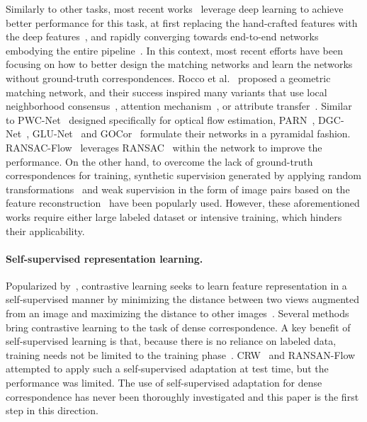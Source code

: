 \documentclass[10pt,twocolumn,letterpaper]{article}
\begin{document}
Similarly to other tasks, most recent works~\cite{kim2019semantic,teed2020raft,wiles2020d2d,jabri2020space,rocco2020efficient,li2020correspondence,li2020dual} leverage deep learning to achieve better performance for this task, at first replacing the hand-crafted features with the deep features~\cite{choy2016universal,kim2017fcss}, and rapidly converging towards end-to-end networks embodying the entire pipeline~\cite{rocco2018neighbourhood,kim2019semantic,li2020correspondence}. 
In this context, most recent efforts have been focusing on how to better design the matching networks and learn the networks without ground-truth correspondences. 
Rocco et al.~\cite{rocco2017convolutional,rocco2018end} proposed a geometric matching network, and their success inspired many variants that use local neighborhood consensus~\cite{rocco2018neighbourhood,li2020correspondence}, attention mechanism~\cite{huang2019dynamic}, or attribute transfer~\cite{kim2019semantic}. 
Similar to PWC-Net~\cite{sun2018pwc} designed specifically for optical flow estimation, PARN~\cite{jeon2018parn}, DGC-Net~\cite{melekhov2019dgc}, GLU-Net~\cite{truong2020glu} and GOCor~\cite{truong2020gocor} formulate their networks in a pyramidal fashion. RANSAC-Flow~\cite{shen2020ransac} leverages RANSAC~\cite{fischler1981random} within the network to improve the performance. On the other hand, to overcome the lack of ground-truth correspondences for training, synthetic supervision generated by applying random transformations~\cite{rocco2017convolutional,truong2020glu,min2020learning,truong2020gocor} and weak supervision in the form of image pairs based on the feature reconstruction~\cite{jeon2018parn,rocco2018end,kim2019semantic} have been popularly used. However, these aforementioned works require either large labeled dataset or intensive training, which hinders their applicability. 
\vspace{-10pt}

\paragraph{Self-supervised representation learning.}
Popularized by~\cite{chen2020simple,he2020momentum,chen2020improved,grill2020bootstrap}, contrastive learning seeks to learn feature representation in a self-supervised manner by minimizing the distance between two views augmented from an image and maximizing the distance to other images~\cite{hadsell2006dimensionality,dai2017contrastive,gupta2020contrastive}. Several methods~\cite{schmidt2016self,choy2016universal,kim2017dctm,kim2017fcss,wang2020dense,pinheiro2020unsupervised} bring contrastive learning to the task of dense correspondence. A key benefit of self-supervised learning is that, because there is no reliance on labeled data, training needs not be limited to the training phase~\cite{detone2016deep,oord2018representation,shocher2018zero,jabri2020space,lai2020mast,shen2020ransac}. CRW~\cite{jabri2020space} and RANSAN-Flow~\cite{shen2020ransac} attempted to apply such a self-supervised adaptation at test time, but the performance was limited. The use of self-supervised adaptation for dense correspondence has never been thoroughly investigated and this paper is the first step in this direction.
\vspace{-10pt}
\end{document}
